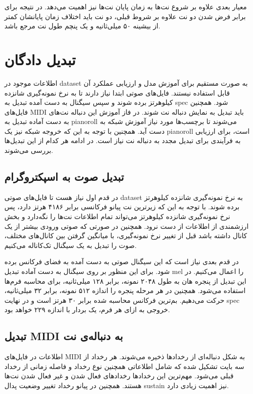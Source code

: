 معیار بعدی علاوه بر شروع نت‌ها به زمان پایان نت‌ها نیز اهمیت می‌دهد. در نتیجه
برای برابر فرض شدن دو نت علاوه بر شروط قبلی، دو نت باید اختلاف زمان پایانشان
کمتر از بیشینه ۵۰ میلی‌ثانیه و یک پنچم طول نت مرجع باشد.

\section{تبدیل دادگان}
اطلاعات موجود در \gls{dataset} به صورت مستقیم برای آموزش مدل و ارزیابی عملکرد آن
قابل استفاده نیستند. فایل‌های صوتی ابتدا نیاز دارند تا به نرخ نمونه‌گیری شانزده
کیلوهرتز برده شوند و سپس سیگنال به دست آمده تبدیل به \gls{spec} شود. همچنین
فایل‌های \gls{MIDI} باید تبدیل به نمایش دنباله نت شوند. در فاز آموزش این
دنباله نت‌های به دست آماده تبدیل به \gls{pianoroll} می‌شوند تا برچسب‌ها مورد
نیاز آموزش شبکه به دست آید. همچنین با توجه به این که خروجه شبکه نیز یک
\gls{pianoroll} است، برای ارزیابی به فرآیندی برای تبدیل مجدد به دنباله نت نیاز
است. در ادامه هر کدام از این تبدیل‌ها بررسی می‌شوند.

\subsection{تبدیل صوت به اسپکتروگرام}
در قدم اول نیاز هست تا فایل‌های صوتی \gls{dataset} به نرخ نمونه‌گیری شانزده
کیلوهرتز برده شوند. با توجه به این که زیرترین نت پیانو فرکانسی برابر ۴۱۸۶ هرتز
دارد، پس نرخ نمونه‌گیری شانزده کیلوهرتز می‌تواند تمام اطلاعات نت‌ها را نگه‌دارد
و بخش ارزشمندی از اطلاعات از دست نرود. همچنین در صورتی که صوتی ورودی بیشتر از یک
کانال داشته باشد قبل از تغییر نرخ نمونه‌گیری، با میانگین گرفتن بین کانال‌های
مختلف، صوت را تبدیل به یک سیگنال تک‌کاناله می‌کنیم.

در قدم بعدی نیاز است که این سیگنال صوتی به دست آمده به فضای فرکانس برده شود.
برای این منظور بر روی سیگنال به دست آماده تبدیل mel را اعمال می‌کنیم. در این
تبدیل از پنجره هان به طول ۲۰۴۸ نمونه، برابر ۱۲۸ میلی‌ثانیه، برای محاسبه فرم‌ها
استفاده می‌شود. همچنین در هر مرحله پنجره را اندازه ۵۱۲ نمونه، برابر ۳۲
میلی‌ثانیه، حرکت می‌دهیم. بم‌ترین فرکانس محاسبه شده برابر ۳۰ هرتز است و در نهایت
\gls{spec} خروجی به ازای هر فرم، یک بردار با اندازه ۲۲۹ خواهد بود.

\subsection{تبدیل MIDI به دنباله‌ی نت}
اطلاعات در فایل‌های \gls{MIDI} به شکل دنباله‌ای از رخدادها ذخیره می‌شوند. هر
رخداد از سه بایت تشکیل شده که شامل اطلاعاتی همچنین نوع رخداد و فاصله زمانی از
رخداد قبلی می‌شود. مهم‌ترین این رخدادها رخدادهای فعال شدن و غیر فعال شدن نت‌ها
هستند. همچنین در پیانو رخداد تغییر وضعیت پدال \gls{sustain} نیز اهمیت زیادی
دارد.

